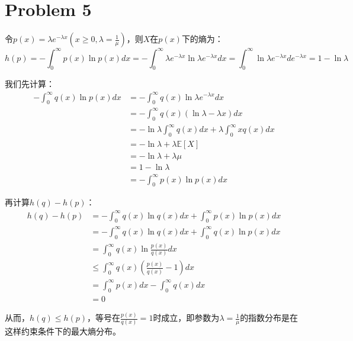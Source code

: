 \documentclass[a4paper,UTF8]{article}
\numberwithin{equation}{section}
\begin{document}
\section*{Problem 5}
令$p(x)=\lambda e^{-\lambda x}(x\geq0,\lambda=\frac{1}{\mu})$，则$X$在$p(x)$下的熵为：
$$h(p)=-\int_0^\infty p(x)\ln p(x) dx=-\int_0^\infty \lambda e^{-\lambda x}\ln \lambda e^{-\lambda x} dx=\int_0^\infty\ln \lambda e^{-\lambda x} de^{-\lambda x}=1-\ln \lambda$$

我们先计算：
\begin{align*}
    -\int_0^\infty q(x)\ln p(x) dx
    &=-\int_0^\infty q(x)\ln \lambda e^{-\lambda x} dx\\
    &=-\int_0^\infty q(x)(\ln \lambda-\lambda x) dx\\
    &=-\ln \lambda\int_0^\infty q(x)dx +  \lambda \int_0^\infty xq(x) dx\\
    &=-\ln \lambda +\lambda \mathbb{E}[X]\\
    &=-\ln \lambda +\lambda\mu\\
    &=1 -\ln \lambda\\
    &= -\int_0^\infty p(x)\ln p(x) dx
\end{align*}

再计算$h(q)-h(p)$：
\begin{align*}
    h(q)-h(p)
    &=-\int_0^\infty q(x)\ln q(x) dx+\int_0^\infty p(x)\ln p(x) dx\\
    &=-\int_0^\infty q(x)\ln q(x) dx+\int_0^\infty q(x)\ln p(x) dx\\
    &=\int_0^\infty q(x)\ln \frac{p(x)}{q(x)} dx\\
    &\leq \int_0^\infty q(x)(\frac{p(x)}{q(x)}-1) dx\\
    &=\int_0^\infty p(x)dx - \int_0^\infty q(x) dx\\
    &=0
\end{align*}

从而，$h(q)\leq h(p)$，等号在$\frac{p(x)}{q(x)}=1$时成立，即参数为$\lambda=\frac{1}{\mu}$的指数分布是在这样约束条件下的最大熵分布。
\end{document}

